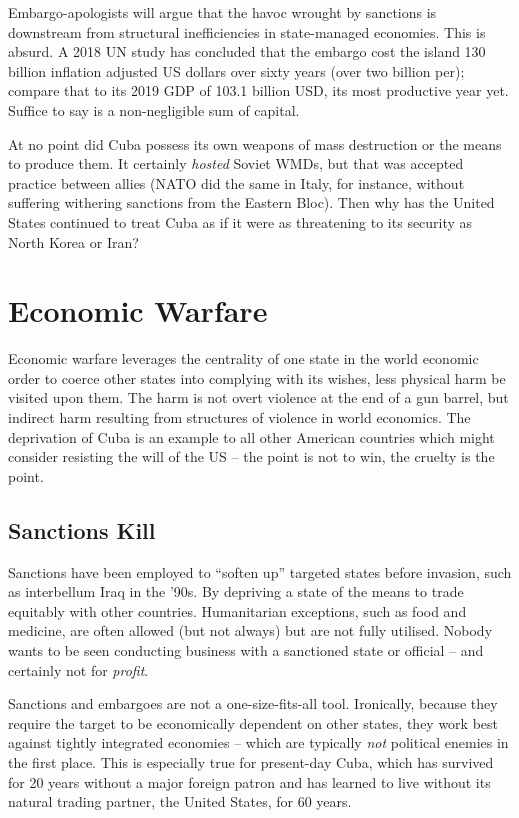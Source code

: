 \documentclass[letterpaper,12pt,twoside]{article} %
\begin{document}
\begin{multicols}{2}
Embargo-apologists will argue that the havoc wrought by sanctions is downstream from structural inefficiencies in state-managed economies. This is absurd. A 2018 UN study has concluded that the embargo cost the island 130 billion inflation adjusted US dollars over sixty years (over two billion per); compare that to its 2019 GDP of 103.1 billion USD, its most productive year yet.\autocite{worldbankcuba} Suffice to say is a non-negligible sum of capital.

At no point did Cuba possess its own weapons of mass destruction or the means to produce them. It certainly \textit{hosted} Soviet WMDs, but that was accepted practice between allies (NATO did the same in Italy, for instance, without suffering withering sanctions from the Eastern Bloc). Then why has the United States continued to treat Cuba as if it were as threatening to its security as North Korea or Iran? 

\vfill
\pagebreak
\section{Economic Warfare}

Economic warfare leverages the centrality of one state in the world economic order to coerce other states into complying with its wishes, less physical harm be visited upon them. The harm is not overt violence at the end of a gun barrel, but indirect harm resulting from structures of violence in world economics. The deprivation of Cuba is an example to all other American countries which might consider resisting the will of the US -- the point is not to win, the cruelty is the point.

\subsection*{Sanctions Kill}

Sanctions have been employed to ``soften up'' targeted states before invasion, such as interbellum Iraq in the '90s.\autocite{crossette1995iraq} By depriving a state of the means to trade equitably with other countries. Humanitarian exceptions, such as food and medicine, are often allowed (but not always) but are not fully utilised. Nobody wants to be seen conducting business with a sanctioned state or official -- and certainly not for \textit{profit}.

Sanctions and embargoes are not a one-size-fits-all tool. Ironically, because they require the target to be economically dependent on other states, they work best against tightly integrated economies -- which are typically \textit{not} political enemies in the first place. This is especially true for present-day Cuba, which has survived for 20 years without a major foreign patron and has learned to live without its natural trading partner, the United States, for 60 years.


\end{multicols}
\end{document}
